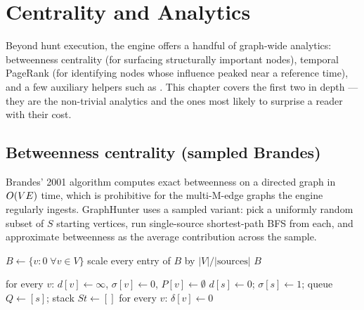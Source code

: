 \chapter{Centrality and Analytics}
\label{ch:analytics}

Beyond hunt execution, the engine offers a handful of graph-wide
analytics: betweenness centrality (for surfacing structurally
important nodes), temporal PageRank (for identifying nodes whose
influence peaked near a reference time), and a few auxiliary
helpers such as . This chapter covers
the first two in depth --- they are the non-trivial analytics and
the ones most likely to surprise a reader with their cost.

\section{Betweenness centrality (sampled Brandes)}

Brandes' 2001 algorithm computes exact betweenness on a directed
graph in $O(VE)$ time, which is prohibitive for the multi-M-edge
graphs the engine regularly ingests. GraphHunter uses a sampled
variant: pick a uniformly random subset of $S$ starting vertices,
run single-source shortest-path BFS from each, and approximate
betweenness as the average contribution across the sample.

\begin{algorithm}
\caption{\textsc{Compute-Betweenness}}\label{alg:betweenness}
$B \gets \{v : 0 \;\forall v \in V\}$\;
scale every entry of $B$ by $|V| / |\text{sources}|$\;
\Return $B$\;
\end{algorithm}

\begin{algorithm}
\caption{\textsc{Brandes-Single-Source}}\label{alg:brandes-ss}
for every $v$: $d[v] \gets \infty$, $\sigma[v] \gets 0$, $P[v] \gets \emptyset$\;
$d[s] \gets 0$; $\sigma[s] \gets 1$; queue $Q \gets [s]$; stack $St \gets []$\;
for every $v$: $\delta[v] \gets 0$\;
\end{algorithm}

